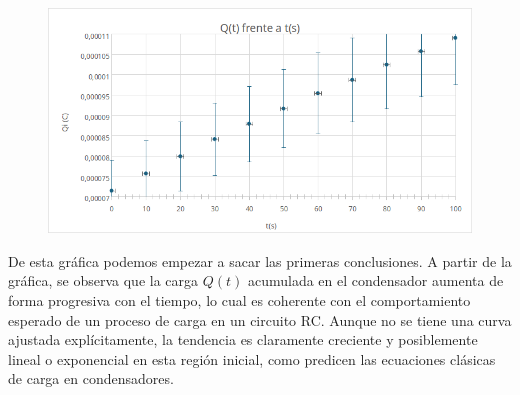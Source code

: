 \documentclass{article}
\begin{document}
\begin{figure}[H]
	\centering
	\includegraphics[width=1\linewidth]{images/graficaQt.png}
	\vspace{0.3em}
	\small{}
\end{figure}

De esta gráfica podemos empezar a sacar las primeras conclusiones. A partir de la gráfica, se observa que la carga $Q(t)$ acumulada en el condensador aumenta de forma progresiva con el tiempo, lo cual es coherente con el comportamiento esperado de un proceso de carga en un circuito RC.
Aunque no se tiene una curva ajustada explícitamente, la tendencia es claramente creciente y posiblemente lineal o exponencial en esta región inicial, como predicen las ecuaciones clásicas de carga en condensadores.

\vspace{10em}
\end{document}
